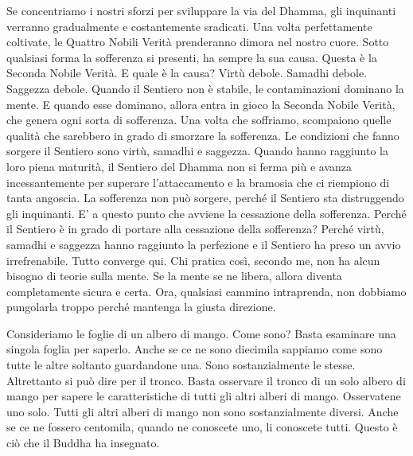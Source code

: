 Se concentriamo i nostri sforzi per sviluppare la via del Dhamma, gli
inquinanti verranno gradualmente e costantemente sradicati. Una volta
perfettamente coltivate, le Quattro Nobili Verità prenderanno dimora nel
nostro cuore. Sotto qualsiasi forma la sofferenza si presenti, ha sempre
la sua causa. Questa è la Seconda Nobile Verità. E quale è la causa?
Virtù debole. Samadhi debole. Saggezza debole. Quando il Sentiero non è
stabile, le contaminazioni dominano la mente. E quando esse dominano,
allora entra in gioco la Seconda Nobile Verità, che genera ogni sorta di
sofferenza. Una volta che soffriamo, scompaiono quelle qualità che
sarebbero in grado di smorzare la sofferenza. Le condizioni che fanno
sorgere il Sentiero sono virtù, samadhi e saggezza. Quando hanno
raggiunto la loro piena maturità, il Sentiero del Dhamma non si ferma
più e avanza incessantemente per superare l'attaccamento e la bramosia
che ci riempiono di tanta angoscia. La sofferenza non può sorgere,
perché il Sentiero sta distruggendo gli inquinanti. E' a questo punto
che avviene la cessazione della sofferenza. Perché il Sentiero è in
grado di portare alla cessazione della sofferenza? Perché virtù, samadhi
e saggezza hanno raggiunto la perfezione e il Sentiero ha preso un avvio
irrefrenabile. Tutto converge qui. Chi pratica così, secondo me, non ha
alcun bisogno di teorie sulla mente. Se la mente se ne libera, allora
diventa completamente sicura e certa. Ora, qualsiasi cammino
intraprenda, non dobbiamo pungolarla troppo perché mantenga la giusta
direzione.

Consideriamo le foglie di un albero di mango. Come sono? Basta esaminare
una singola foglia per saperlo. Anche se ce ne sono diecimila sappiamo
come sono tutte le altre soltanto guardandone una. Sono sostanzialmente
le stesse. Altrettanto si può dire per il tronco. Basta osservare il
tronco di un solo albero di mango per sapere le caratteristiche di tutti
gli altri alberi di mango. Osservatene uno solo. Tutti gli altri alberi
di mango non sono sostanzialmente diversi. Anche se ce ne fossero
centomila, quando ne conoscete uno, li conoscete tutti. Questo è ciò che
il Buddha ha insegnato.

